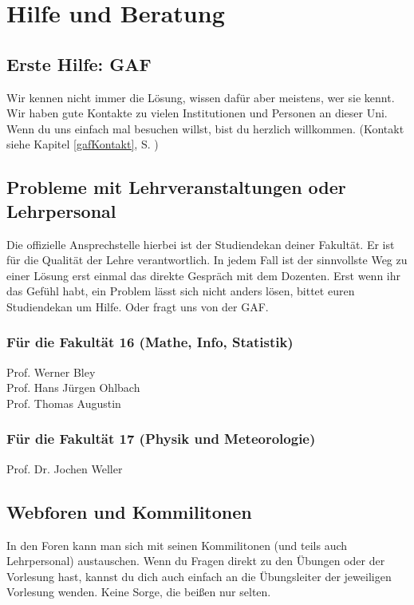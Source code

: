 ﻿\chapter{Hilfe und Beratung}

\section{Erste Hilfe: GAF}

Wir kennen nicht immer die Lösung, wissen dafür aber meistens, wer sie
kennt. Wir haben gute Kontakte zu vielen Institutionen und Personen an
dieser Uni. Wenn du uns einfach mal besuchen willst, bist du herzlich
willkommen. (Kontakt siehe Kapitel \ref{gafKontakt}, S. \pageref{gafKontakt})

\section{Probleme mit Lehrveranstaltungen oder Lehrpersonal}

Die offizielle Ansprechstelle hierbei ist der Studiendekan deiner
Fakultät. Er ist für die Qualität der Lehre verantwortlich. In jedem
Fall ist der sinnvollste Weg zu einer Lösung erst einmal das direkte
Gespräch mit dem Dozenten. Erst wenn ihr das Gefühl habt, ein Problem
lässt sich nicht anders lösen, bittet euren Studiendekan um
Hilfe. Oder fragt uns von der GAF.

\subsection*{Für die Fakultät 16 (Mathe, Info, Statistik)}
Prof. Werner Bley\\ %
Prof. Hans Jürgen Ohlbach\\
Prof. Thomas Augustin %

\subsection*{Für die Fakultät 17 (Physik und Meteorologie)}
Prof. Dr. Jochen Weller

\section{Webforen und Kommilitonen}

In den Foren kann man sich mit seinen Kommilitonen
(und teils auch Lehrpersonal) austauschen. Wenn du Fragen direkt zu den
Übungen oder der Vorlesung hast, kannst du dich auch einfach an die
Übungsleiter der jeweiligen Vorlesung wenden. Keine Sorge, die beißen nur
selten.\\


